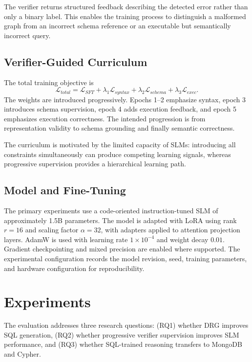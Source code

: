 \documentclass[conference]{IEEEtran}
\begin{document}
The verifier returns structured feedback describing the detected error rather than only a binary label. This enables the training process to distinguish a malformed graph from an incorrect schema reference or an executable but semantically incorrect query.

\subsection{Verifier-Guided Curriculum}
The total training objective is
\begin{equation}
\mathcal{L}_{total}=
\mathcal{L}_{SFT}+
\lambda_1\mathcal{L}_{syntax}+
\lambda_2\mathcal{L}_{schema}+
\lambda_3\mathcal{L}_{exec}.
\end{equation}
The weights are introduced progressively. Epochs 1--2 emphasize syntax, epoch 3 introduces schema supervision, epoch 4 adds execution feedback, and epoch 5 emphasizes execution correctness. The intended progression is from representation validity to schema grounding and finally semantic correctness.

The curriculum is motivated by the limited capacity of SLMs: introducing all constraints simultaneously can produce competing learning signals, whereas progressive supervision provides a hierarchical learning path.

\subsection{Model and Fine-Tuning}
The primary experiments use a code-oriented instruction-tuned SLM of approximately 1.5B parameters. The model is adapted with LoRA using rank $r=16$ and scaling factor $\alpha=32$, with adapters applied to attention projection layers. AdamW is used with learning rate $1\times10^{-4}$ and weight decay $0.01$. Gradient checkpointing and mixed precision are enabled where supported. The experimental configuration records the model revision, seed, training parameters, and hardware configuration for reproducibility.

\section{Experiments}
\label{sec:experiments}
The evaluation addresses three research questions: (RQ1) whether DRG improves SQL generation, (RQ2) whether progressive verifier supervision improves SLM performance, and (RQ3) whether SQL-trained reasoning transfers to MongoDB and Cypher.
\end{document}
